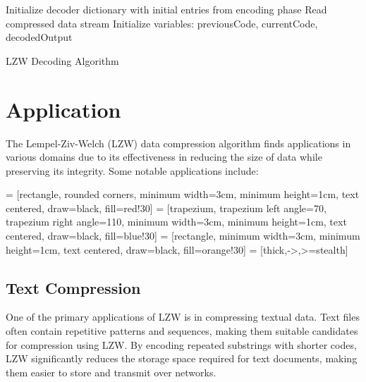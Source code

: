 \documentclass[12pt, a4paper]{article}
\begin{document}
\begin{algorithm}[H]
\SetAlgoLined
{}
 Initialize decoder dictionary with initial entries from encoding phase\;
 Read compressed data stream\;
 Initialize variables: previousCode, currentCode, decodedOutput\;
 \caption{LZW Decoding Algorithm}
\end{algorithm}


\clearpage %

\section{Application}

The Lempel-Ziv-Welch (LZW) data compression algorithm finds applications in various domains due to its effectiveness in reducing the size of data while preserving its integrity. Some notable applications include:

 = [rectangle, rounded corners, minimum width=3cm, minimum height=1cm, text centered, draw=black, fill=red!30]
 = [trapezium, trapezium left angle=70, trapezium right angle=110, minimum width=3cm, minimum height=1cm, text centered, draw=black, fill=blue!30]
 = [rectangle, minimum width=3cm, minimum height=1cm, text centered, draw=black, fill=orange!30]
 = [thick,->,>=stealth]

\subsection{Text Compression}

One of the primary applications of LZW is in compressing textual data. Text files often contain repetitive patterns and sequences, making them suitable candidates for compression using LZW. By encoding repeated substrings with shorter codes, LZW significantly reduces the storage space required for text documents, making them easier to store and transmit over networks.
\end{document}
